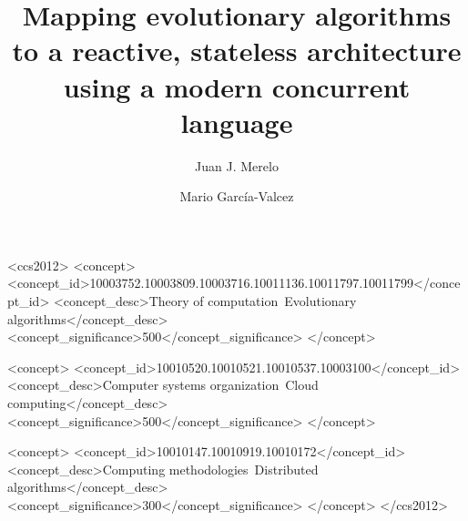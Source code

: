 \documentclass[sigconf]{acmart}
\begin{document}
\title{Mapping evolutionary algorithms to a reactive, stateless architecture
  using a modern concurrent language}

\author{Juan J. Merelo}

\author{Mario García-Valcez}

\renewcommand{\shortauthors}{J. J. Merelo et al.}

\maketitle


\begin{abstract}
\end{abstract}

\begin{CCSXML}
<ccs2012>
<concept>
<concept_id>10003752.10003809.10003716.10011136.10011797.10011799</concept_id>
<concept_desc>Theory of computation~Evolutionary algorithms</concept_desc>
<concept_significance>500</concept_significance>
</concept>

<concept>
<concept_id>10010520.10010521.10010537.10003100</concept_id>
<concept_desc>Computer systems organization~Cloud computing</concept_desc>
<concept_significance>500</concept_significance>
</concept>

<concept>
<concept_id>10010147.10010919.10010172</concept_id>
<concept_desc>Computing methodologies~Distributed algorithms</concept_desc>
<concept_significance>300</concept_significance>
</concept>
</ccs2012>
\end{CCSXML}



\end{document}
